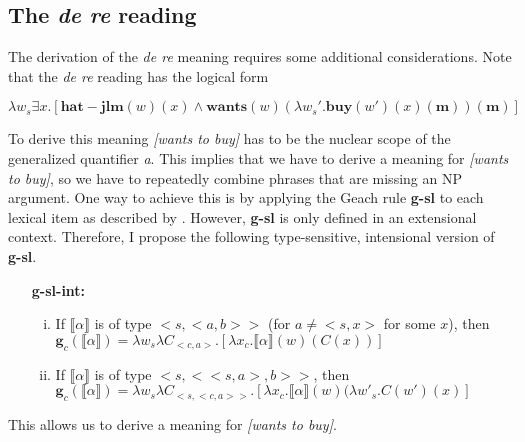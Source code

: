 \documentclass[parskip=half]{scrartcl}
\newcommand{\sem}[1]{\ensuremath{\llbracket#1\rrbracket}}
\begin{document}
\normalsize

\subsection{The \textit{de re} reading}

The derivation of the \textit{de re} meaning requires some additional considerations. Note that the \textit{de re} reading
has the logical form

\begin{exe}
\ex $\lambda w_s  \exists x. [\mathbf{hat-jlm}(w)(x) \land \mathbf{wants}(w)(\lambda w_s'. \mathbf{buy}(w')(x)(\mathbf{m}))(\mathbf{m})]$
\end{exe} 

To derive this meaning \textit{[wants to buy]} has to be the nuclear scope of the generalized quantifier \textit{a}. This implies that we have to derive a 
meaning for \textit{[wants to buy]}, so we have to repeatedly combine phrases that are missing an NP argument. 
One way to achieve this is by applying the Geach rule \textbf{g-sl} to each lexical item 
as described by \cite{jacobson2014}. However, \textbf{g-sl} is only defined in an extensional context. Therefore, I propose the following type-sensitive, intensional version of \textbf{g-sl}.

\begin{enumerate}
\item[\textbf{g-sl-int:}] 
\begin{enumerate}[i.]
\item If \sem{\alpha} is of type $<s, <a,b>>$ (for $a \ne <s,x>$ for some $x$), then \\ $\mathbf{g}_c(\sem{\alpha}) = \lambda w_s \lambda C_{<c,a>}.[\lambda x_c. \sem{\alpha}(w)(C(x))]$
\item If \sem{\alpha} is of type $<s, <<s,a>,b>>$, then \\ $\mathbf{g}_c(\sem{\alpha}) = \lambda w_s \lambda C_{<s, <c,a>>}.[\lambda x_c. \sem{\alpha}(w)(\lambda w'_s .C(w')(x)]$
\end{enumerate}
\end{enumerate}

\pagebreak
This allows us to derive a meaning for \textit{[wants to buy]}.
\end{document}
